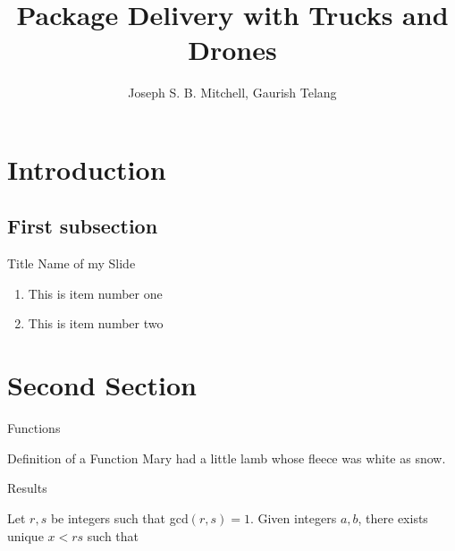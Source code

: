 \documentclass{beamer}
\title{Package Delivery with Trucks and Drones}
\subtitle{}
\author{Joseph S. B. Mitchell, Gaurish Telang}
\institute{Stony Brook University, New York}
\begin{document}

\begin{frame}
  \titlepage
\end{frame}

\section{Introduction}
\subsection{First subsection }
\begin{frame}[t]{Title Name of my Slide} \vspace{10pt} 
  \begin{enumerate}
  \item This is item number one
  \item This is item number two
  \end{enumerate}
\end{frame}

\section{Second Section}

\begin{frame}[t]{Functions}\vspace{4pt}
  \begin{block}{Definition of a Function}
  Mary had a little lamb whose fleece was white as snow. 
  \end{block}
\end{frame}

\begin{frame}[t]{Results} \vspace{4pt}
  \begin{theorem}
         Let $r, s$ be integers such that gcd$(r, s)=1$. 
        Given integers $a,b$, there exists unique 
        $x <rs$ such that 
   \end{theorem} 
 \end{frame}


 \begin{frame}
   \begin{center}
  \end{center}
\end{frame}
\end{document}
